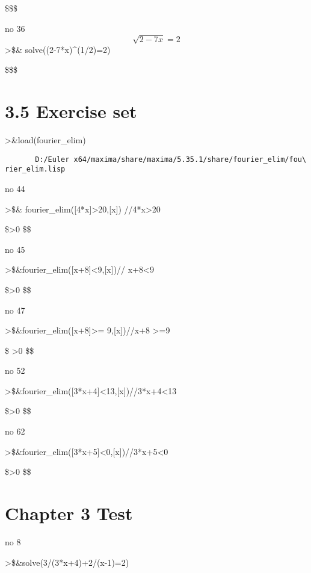 \documentclass[
]{book}
\begin{document}
\$\left[ x=-4 \right] \$\$

no 36\[\sqrt{2-7x}=2\]\textgreater\$\& solve((2-7*x)\^{}(1/2)=2)

\$\left[ x=-\frac{2}{7} \right] \$\$

\section{3.5 Exercise set}\label{exercise-set-2}

\textgreater\&load(fourier\_elim)

\begin{verbatim}
       D:/Euler x64/maxima/share/maxima/5.35.1/share/fourier_elim/fou\
rier_elim.lisp
\end{verbatim}

no 44

\textgreater\$\& fourier\_elim({[}4*x{]}\textgreater20,{[}x{]}) //4*x\textgreater20

\$\left[ \left[ 4\,\left(x-5\right) \right] \textgreater0 \right{]} \$\$

no 45

\textgreater\$\&fourier\_elim({[}x+8{]}\textless9,{[}x{]})// x+8\textless9

\$\left[ \left[ 1-x \right] \textgreater0 \right{]} \$\$

no 47

\textgreater\$\&fourier\_elim({[}x+8{]}\textgreater= 9,{[}x{]})//x+8 \textgreater=9

\$\left[ \left[ x-1 \right] =0 \right{]} \lor \left[ \left[ x-1   \right] \textgreater0 \right{]} \$\$

no 52

\textgreater\$\&fourier\_elim({[}3*x+4{]}\textless13,{[}x{]})//3*x+4\textless13

\$\left[ \left[ -3\,\left(x-3\right) \right] \textgreater0 \right{]} \$\$

no 62

\textgreater\$\&fourier\_elim({[}3*x+5{]}\textless0,{[}x{]})//3*x+5\textless0

\$\left[ \left[ -3\,x-5 \right] \textgreater0 \right{]} \$\$

\section{Chapter 3 Test}\label{chapter-3-test}

no 8

\textgreater\$\&solve(3/(3*x+4)+2/(x-1)=2)
\end{document}
